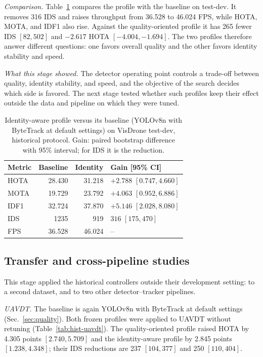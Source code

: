 \documentclass[journal]{new-aiaa}
\begin{document}
\emph{Comparison.} Table~\ref{tab:identity} compares the profile with the
baseline on test-dev. It removes 316 IDS and raises throughput
from 36.528 to 46.024 FPS, while HOTA, MOTA, and IDF1 also rise. Against the
quality-oriented profile it has 265 fewer IDS $[82, 502]$ and $-2.617$ HOTA
$[-4.004, -1.694]$. The two profiles therefore answer different questions: one
favors overall quality and the other favors identity stability and speed.

\emph{What this stage showed.} The detector operating point controls a
trade-off between quality, identity stability, and speed, and the objective
of the search decides which side is favored. The next stage tested whether
such profiles keep their effect outside the data and pipeline on which they
were tuned.

\begin{table}[htbp]
\caption{Identity-aware profile versus its baseline (YOLOv8n with ByteTrack at
default settings) on VisDrone test-dev, historical protocol. Gain: paired
bootstrap difference with 95\% interval; for IDS it is the reduction.}
\label{tab:identity}
\centering\footnotesize
\setlength{\tabcolsep}{4pt}
\begin{tabular}{@{}lrrl@{}}
\toprule
Metric & Baseline & Identity & Gain [95\% CI]\\
\midrule
HOTA & 28.430 & 31.218 & $+2.788$ $[0.747, 4.660]$\\
MOTA & 19.729 & 23.792 & $+4.063$ $[0.952, 6.886]$\\
IDF1 & 32.724 & 37.870 & $+5.146$ $[2.028, 8.080]$\\
IDS & 1235 & 919 & $316$ $[175, 470]$\\
FPS & 36.528 & 46.024 & --\\
\bottomrule
\end{tabular}
\end{table}

\subsection{Transfer and cross-pipeline studies}\label{sec:transfer}

This stage applied the historical controllers outside their development
setting: to a second dataset, and to two other detector--tracker pipelines.

\emph{UAVDT.} The baseline is again YOLOv8n with ByteTrack at default settings
(Sec.~\ref{sec:quality}). Both frozen profiles were applied to UAVDT
\cite{du2018uavdt} without retuning (Table~\ref{tab:hist-uavdt}). The
quality-oriented profile raised HOTA by 4.305 points $[2.740, 5.709]$ and the
identity-aware profile by 2.845 points $[1.238, 4.348]$; their IDS reductions
are 237 $[104, 377]$ and 250 $[110, 404]$.
\end{document}
